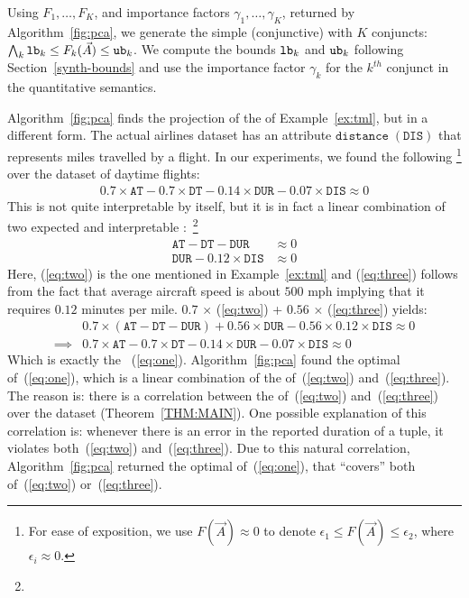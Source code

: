 Using \views $F_1, \ldots, F_K$, and importance factors
$\gamma_1,\ldots,\gamma_K$, returned by Algorithm~\ref{fig:pca}, we generate
the simple (conjunctive) \invariant with $K$ conjuncts:
%
$
 \bigwedge_k  {\mathtt{lb}}_k \leq F_k(\vec{A}) \leq {\mathtt{ub}}_k
$.
%
We compute the bounds ${\mathtt{lb}}_k$ and ${\mathtt{ub}}_k$ following Section~\ref{synth-bounds}
and use the importance factor $\gamma_k$ for the $k^{th}$ conjunct in the
quantitative semantics.

\begin{example}\label{ex:int} Algorithm~\ref{fig:pca} finds the projection of the \di of
Example~\ref{ex:tml}, but in a different form. The actual airlines dataset has
an attribute $\mathtt{distance}\; (\mathtt{DIS})$ that represents miles travelled by a flight. In
our experiments, we found the following \di\footnote{For ease of exposition, we
use $F(\vec{A}) \approx 0$ to denote $\epsilon_1 \le F(\vec{A}) \le
\epsilon_2$, where $\epsilon_i \approx 0$.} over the dataset of daytime flights:
%
{
\begin{align}\label{eq:one}
0.7 \times \mathtt{AT} - 0.7 \times \mathtt{DT} - 0.14 \times \mathtt{DUR} - 0.07 \times \mathtt{DIS} \approx 0
\end{align}
}
%
This \invariant is not quite interpretable by itself, but it is in fact a
linear combination of two expected and interpretable
\invariants:~\footnote{}
%
{
\begin{align}
	\mathtt{AT} - \mathtt{DT} - \mathtt{DUR} &\approx 0 \label{eq:two}\\
	\mathtt{DUR} - 0.12 \times \mathtt{DIS} &\approx 0 \label{eq:three}
\end{align}
}
%
Here, (\ref{eq:two}) is the one mentioned in Example~\ref{ex:tml} and
(\ref{eq:three}) follows from the fact that average aircraft speed is about
$500$ mph implying that it requires $0.12$ minutes per mile. $0.7$ $\times$
(\ref{eq:two}) + $0.56$ $\times$ (\ref{eq:three}) yields:
%
{
\begin{align*}
&0.7 \times (\mathtt{AT} - \mathtt{DT} - \mathtt{DUR}) + 0.56 \times \mathtt{DUR} - 0.56 \times 0.12 \times \mathtt{DIS} \approx 0 \\
\implies & 0.7 \times \mathtt{AT} - 0.7 \times \mathtt{DT} - 0.14 \times \mathtt{DUR} - 0.07 \times \mathtt{DIS} \approx 0
\end{align*}
}
%
Which is exactly the \di~(\ref{eq:one}). Algorithm~\ref{fig:pca} found the
optimal \view of~(\ref{eq:one}), which is a linear combination of the \views
of~(\ref{eq:two}) and~(\ref{eq:three}). The reason is: there is a correlation
between the \views of~(\ref{eq:two}) and~(\ref{eq:three}) over the dataset
(Theorem~\ref{THM:MAIN}). One possible explanation of this correlation is:
whenever there is an error in the reported duration of a tuple, it violates
both~(\ref{eq:two}) and~(\ref{eq:three}). Due to this natural correlation,
Algorithm~\ref{fig:pca} returned the optimal \view of~(\ref{eq:one}), that
``covers'' both \views of~(\ref{eq:two}) or~(\ref{eq:three}).

%
\end{example}

